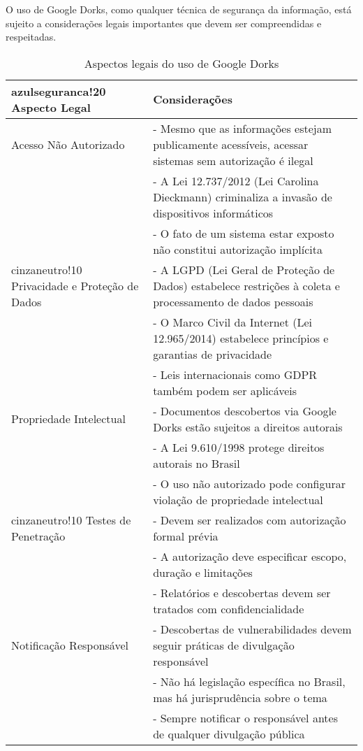 \documentclass[12pt,a4paper]{book}
\begin{document}
O uso de Google Dorks, como qualquer técnica de segurança da informação, está sujeito a considerações legais importantes que devem ser compreendidas e respeitadas.

\begin{table}[h]
\centering
\begin{tabular}{|p{4cm}|p{11cm}|}
\hline
{azulseguranca!20} \textbf{Aspecto Legal} & \textbf{Considerações} \\
\hline
Acesso Não Autorizado & - Mesmo que as informações estejam publicamente acessíveis, acessar sistemas sem autorização é ilegal \\
& - A Lei 12.737/2012 (Lei Carolina Dieckmann) criminaliza a invasão de dispositivos informáticos \\
& - O fato de um sistema estar exposto não constitui autorização implícita \\
\hline
{cinzaneutro!10} Privacidade e Proteção de Dados & - A LGPD (Lei Geral de Proteção de Dados) estabelece restrições à coleta e processamento de dados pessoais \\
& - O Marco Civil da Internet (Lei 12.965/2014) estabelece princípios e garantias de privacidade \\
& - Leis internacionais como GDPR também podem ser aplicáveis \\
\hline
Propriedade Intelectual & - Documentos descobertos via Google Dorks estão sujeitos a direitos autorais \\
& - A Lei 9.610/1998 protege direitos autorais no Brasil \\
& - O uso não autorizado pode configurar violação de propriedade intelectual \\
\hline
{cinzaneutro!10} Testes de Penetração & - Devem ser realizados com autorização formal prévia \\
& - A autorização deve especificar escopo, duração e limitações \\
& - Relatórios e descobertas devem ser tratados com confidencialidade \\
\hline
Notificação Responsável & - Descobertas de vulnerabilidades devem seguir práticas de divulgação responsável \\
& - Não há legislação específica no Brasil, mas há jurisprudência sobre o tema \\
& - Sempre notificar o responsável antes de qualquer divulgação pública \\
\hline
\end{tabular}
\caption{Aspectos legais do uso de Google Dorks}
\end{table}
\end{document}
